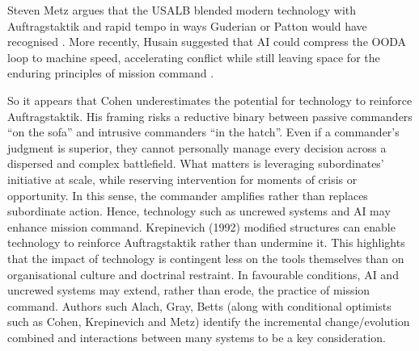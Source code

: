 Steven Metz argues that the USALB blended modern technology with Auftragstaktik and rapid tempo in ways Guderian or Patton would have recognised \parencite{METZ_2000}. More recently, Husain suggested that AI could compress the OODA loop to machine speed, accelerating conflict while still leaving space for the enduring principles of mission command \parencite{HUSAIN_2021}.


So it appears that Cohen underestimates the potential for technology to reinforce Auftragstaktik. His framing risks a reductive binary between passive commanders ``on the sofa” and intrusive commanders ``in the hatch”. Even if a commander’s judgment is superior, they cannot personally manage every decision across a dispersed and complex battlefield. What matters is leveraging subordinates’ initiative at scale, while reserving intervention for moments of crisis or opportunity. In this sense, the commander amplifies rather than replaces subordinate action. Hence, technology such as uncrewed systems and AI may enhance mission command. Krepinevich (1992) modified structures can enable technology to reinforce Auftragstaktik rather than undermine it\nocite{KREP_1992}. This highlights that the impact of technology is contingent less on the tools themselves than on organisational culture and doctrinal restraint. In favourable conditions, AI and uncrewed systems may extend, rather than erode, the practice of mission command. %
 Authors such Alach, Gray, Betts (along with conditional optimists such as Cohen, Krepinevich and Metz) identify the incremental change/evolution combined and interactions between many systems to be a key consideration.

